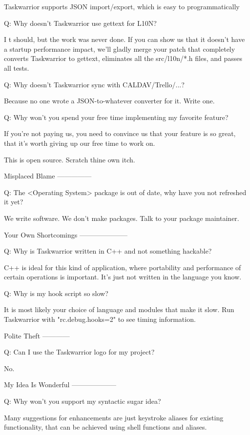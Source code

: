 \documentclass[t,handout]{beamer}
\begin{document}
    Taskwarrior supports JSON import/export, which is easy to programmatically

Q: Why doesn't Taskwarrior use gettext for L10N?

    I t should, but the work was never done. If you can show us that it doesn't have a startup performance impact, we'll gladly merge your patch that completely converts Taskwarrior to gettext, eliminates all the src/l10n/*.h files, and passes all tests.

Q: Why doesn't Taskwarrior sync with CALDAV/Trello/...?

    Because no one wrote a JSON-to-whatever converter for it. Write one.

Q: Why won't you spend your free time implementing my favorite feature?

    If you're not paying us, you need to convince us that your feature is so great, that it's worth giving up our free time to work on.

    This is open source. Scratch thine own itch.

Misplaced Blame
---------------

Q: The <Operating System> package is out of date, why have you not refreshed it yet?

    We write software. We don't make packages. Talk to your package maintainer.

Your Own Shortcomings
---------------------

Q: Why is Taskwarrior written in C++ and not something hackable?

    C++ is ideal for this kind of application, where portability and performance of certain operations is important. It's just not written in the language you know.

Q: Why is my hook script so slow?

    It is most likely your choice of language and modules that make it slow. Run Taskwarrior with "rc.debug.hooks=2" to see timing information.

Polite Theft
------------

Q: Can I use the Taskwarrior logo for my project?

    No.

My Idea Is Wonderful
--------------------

Q: Why won't you support my syntactic sugar idea?

    Many suggestions for enhancements are just keystroke aliases for existing functionality, that can be achieved using shell functions and aliases.
\end{document}
